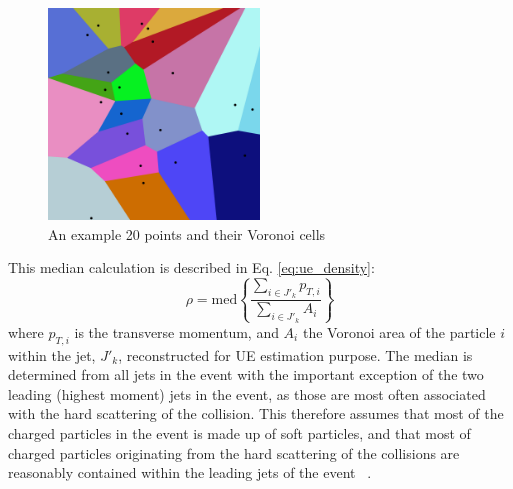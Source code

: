 \begin{figure}[htpb]
  \centering
  \includegraphics[width=0.5\textwidth]{Data_Analysis/voronoi_diagram.png}
  \caption{An example 20 points and their Voronoi cells }
  \label{fig:voronoi}
\end{figure}

 This median calculation is described in Eq. \ref{eq:ue_density}:
\begin{equation}
\label{eq:ue_density}
  \rho = \mathrm{med} \left\{ \frac{\sum_{i\in J'_k}
    p_{T,i}}{\sum_{i\in J'_k} A_i} \right\}
\end{equation}
where $p_{T,i}$ is the transverse momentum, and $A_i$ the Voronoi area of the particle $i$ within the jet, $J'_k$, reconstructed for UE estimation purpose.  The median is determined from all jets in the event with the important exception of the two leading (highest moment) jets in the event, as those are most often associated with the hard scattering of the collision. This therefore assumes that most of the charged particles in the event is made up of soft particles, and that most of charged particles originating from the hard scattering of the collisions are reasonably contained within the leading jets of the event ~\cite{Cacciari:2009dp}.\\

